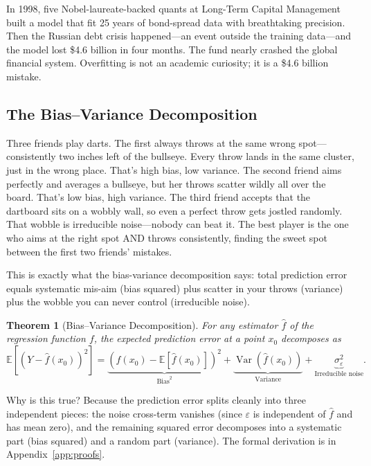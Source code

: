 \documentclass[11pt,a4paper]{article}
\theoremstyle{definition}
\theoremstyle{plain}
\newtheorem{theorem}{Theorem}[section]
\theoremstyle{remark}
\newcommand{\E}{\mathbb{E}}
\newcommand{\Var}{\operatorname{Var}}
\begin{document}
In 1998, five Nobel-laureate-backed quants at Long-Term Capital Management built a model that fit 25 years of bond-spread data with breathtaking precision. Then the Russian debt crisis happened---an event outside the training data---and the model lost \$4.6 billion in four months. The fund nearly crashed the global financial system. Overfitting is not an academic curiosity; it is a \$4.6 billion mistake.

\subsection{The Bias--Variance Decomposition}

\begin{toystory}[title={The Three Dartboard Players}]
Three friends play darts. The first always throws at the same wrong spot---consistently two inches left of the bullseye. Every throw lands in the same cluster, just in the wrong place. That's high bias, low variance. The second friend aims perfectly and averages a bullseye, but her throws scatter wildly all over the board. That's low bias, high variance. The third friend accepts that the dartboard sits on a wobbly wall, so even a perfect throw gets jostled randomly. That wobble is irreducible noise---nobody can beat it. The best player is the one who aims at the right spot AND throws consistently, finding the sweet spot between the first two friends' mistakes.

This is exactly what the bias-variance decomposition says: total prediction error equals systematic mis-aim (bias squared) plus scatter in your throws (variance) plus the wobble you can never control (irreducible noise).
\end{toystory}

\begin{theorem}[Bias--Variance Decomposition]\label{thm:biasvar}
For any estimator $\hat{f}$ of the regression function $f$, the expected prediction error at a point $x_0$ decomposes as
\begin{equation}\label{eq:biasvar}
  \E\!\left[(Y - \hat{f}(x_0))^2\right]
  = \underbrace{\left(f(x_0) - \E[\hat{f}(x_0)]\right)^2}_{\text{Bias}^2}
  + \underbrace{\Var(\hat{f}(x_0))}_{\text{Variance}}
  + \underbrace{\sigma^2_\varepsilon}_{\text{Irreducible noise}}.
\end{equation}
\end{theorem}

Why is this true? Because the prediction error splits cleanly into three independent pieces: the noise cross-term vanishes (since $\varepsilon$ is independent of $\hat{f}$ and has mean zero), and the remaining squared error decomposes into a systematic part (bias squared) and a random part (variance). The formal derivation is in Appendix~\ref{app:proofs}.
\end{document}
